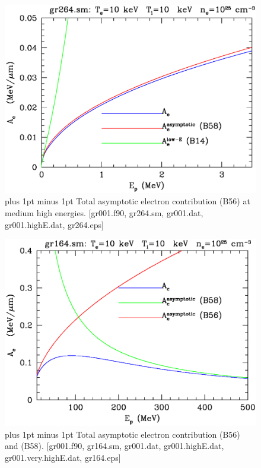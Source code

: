\documentclass[preprint,12pt,eqsecnum,nofootinbib,amsmath,amssymb]{revtex4}
\newcommand{\footnoteskip}{\baselineskip 12pt plus 1pt minus 1pt}
\begin{document}
\pagebreak

\begin{figure}[h!]
\includegraphics[scale=0.45]{gr264.eps} 
\vskip-0.8cm 
\caption{\footnoteskip  
  Total asymptotic electron contribution (B56) at medium high
  energies.  [gr001.f90, gr264.sm, gr001.dat, gr001.highE.dat,
  gr264.eps] 
}
\label{fig:gr264}
\end{figure}

\begin{figure}[h!]
\includegraphics[scale=0.45]{gr164.eps} 
\vskip-0.8cm 
\caption{\footnoteskip  
  Total asymptotic electron contribution (B56) and (B58).  [gr001.f90,
  gr164.sm, gr001.dat, gr001.highE.dat, gr001.very.highE.dat, gr164.eps] 
}
\label{fig:gr164}
\end{figure}
\end{document}

